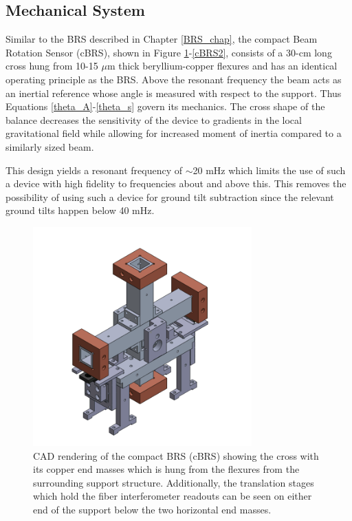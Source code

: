\documentclass [12pt, proquest]{uwthesis}[2019]
\begin{document}
\subsection{Mechanical System}

Similar to the BRS described in Chapter \ref{BRS_chap}, the compact Beam Rotation Sensor (cBRS), shown in Figure \ref{cBRS1}-\ref{cBRS2}, consists of a 30-cm long cross hung from 10-15 $\mu$m thick beryllium-copper flexures and has an identical operating principle as the BRS. Above the resonant frequency the beam acts as an inertial reference whose angle is measured with respect to the support. Thus Equations \ref{theta_A}-\ref{theta_s} govern its mechanics. The cross shape of the balance decreases the sensitivity of the device to gradients in the local gravitational field while allowing for increased moment of inertia compared to a similarly sized beam. 

This design yields a resonant frequency of $\sim$20 mHz which limits the use of such a device with high fidelity to frequencies about and above this. This removes the possibility of using such a device for ground tilt subtraction since the relevant ground tilts happen below 40 mHz. 

\begin{figure}[!h]
\begin{center}
\includegraphics[width=0.75\textwidth]{cBRSIso.png}
\end{center}
\caption[CAD rendering of the cBRS]{CAD rendering of the compact BRS (cBRS) showing the cross with its copper end masses which is hung from the flexures from the surrounding support structure. Additionally, the translation stages which hold the fiber interferometer readouts can be seen on either end of the support below the two horizontal end masses.}
\label{cBRS1}
\end{figure}
\end{document}
